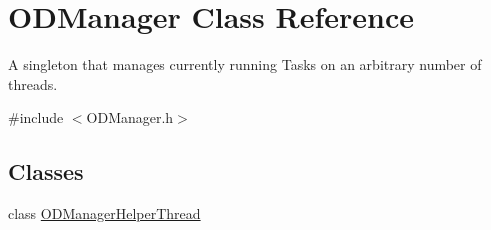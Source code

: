 \hypertarget{class_o_d_manager}{}\section{O\+D\+Manager Class Reference}
\label{class_o_d_manager}


A singleton that manages currently running Tasks on an arbitrary number of threads.  




{\ttfamily \#include $<$O\+D\+Manager.\+h$>$}

\subsection*{Classes}
\begin{DoxyCompactItemize}
\item 
class \hyperlink{class_o_d_manager_1_1_o_d_manager_helper_thread}{O\+D\+Manager\+Helper\+Thread}
\end{DoxyCompactItemize}
